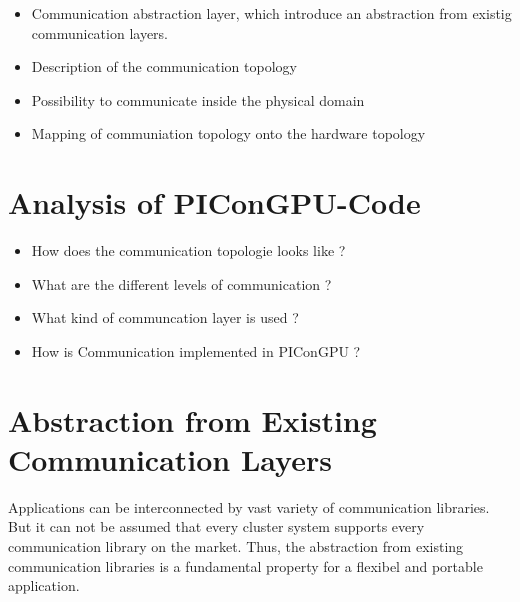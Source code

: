 \begin{itemize}
\item Communication abstraction layer, which introduce an abstraction
  from existig communication layers.
\item Description of the communication topology
\item Possibility to communicate inside the physical domain
\item Mapping of communiation topology onto the hardware topology
\end{itemize}

\section{Analysis of PIConGPU-Code}
\begin{itemize}
  \item How does the communication topologie looks like ?
  \item What are the different levels of communication ?
  \item What kind of communcation layer is used ?
  \item How is Communication implemented in PIConGPU ?
\end{itemize}

\section{Abstraction from Existing Communication Layers}

Applications can be interconnected by vast variety of communication
libraries. But it can not be assumed that every cluster system
supports every communication library on the market.  Thus, the
abstraction from existing communication libraries is a fundamental
property for a flexibel and portable application.

